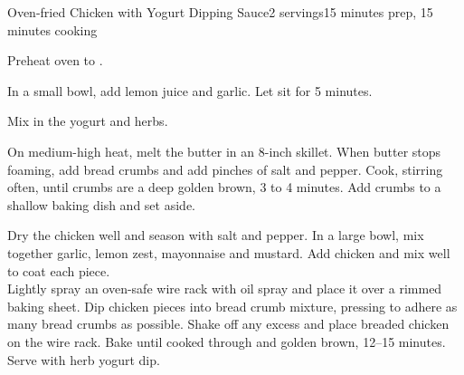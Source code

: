 \documentclass[../Cookbook.tex]{subfiles}
\begin{document}
\begin{recipe}{Oven-fried Chicken with Yogurt Dipping Sauce}{2 servings}{15 minutes prep, 15 minutes cooking}

Preheat oven to .

In a small bowl, add lemon juice and garlic. Let sit for 5 minutes.

Mix in the yogurt and herbs.

On medium-high heat, melt the butter in an 8-inch skillet. When butter stops foaming, add bread crumbs and add pinches of salt and pepper. Cook, stirring often, until crumbs are a deep golden brown, 3 to 4 minutes. Add crumbs to a shallow baking dish and set aside.

Dry the chicken well and season with salt and pepper. In a large bowl, mix together garlic, lemon zest, mayonnaise and mustard. Add chicken and mix well to coat each piece.\\
Lightly spray an oven-safe wire rack with oil spray and place it over a rimmed baking sheet. Dip chicken pieces into bread crumb mixture, pressing to adhere as many bread crumbs as possible. Shake off any excess and place breaded chicken on the wire rack. Bake until cooked through and golden brown, 12--15 minutes. Serve with herb yogurt dip.


\end{recipe}
\end{document}
